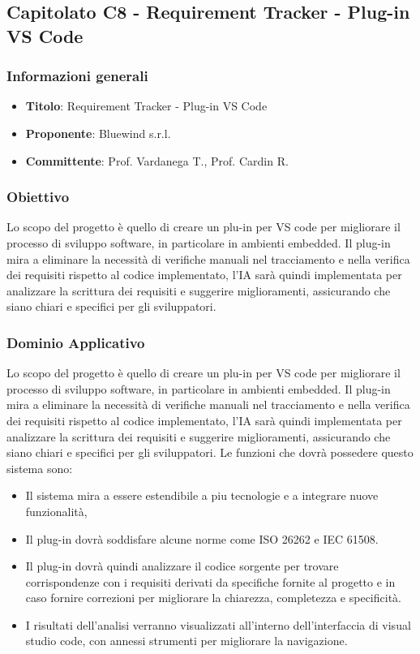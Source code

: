 \subsection{Capitolato C8 - Requirement Tracker - Plug-in VS Code}
     \subsubsection{Informazioni generali}
        \begin{itemize}
            \item \textbf{Titolo}: Requirement Tracker - Plug-in VS Code
            \item \textbf{Proponente}: Bluewind s.r.l.
            \item \textbf{Committente}: Prof. Vardanega T., Prof. Cardin R.
        \end{itemize}
    \subsubsection{Obiettivo}
    Lo scopo del progetto è quello di creare un plu-in per VS code per migliorare il processo di sviluppo software, in particolare in ambienti embedded.
Il plug-in mira a eliminare la necessità di verifiche manuali nel tracciamento e nella verifica dei requisiti rispetto al codice implementato, l’IA sarà quindi implementata per analizzare la scrittura dei requisiti e suggerire miglioramenti, assicurando che siano chiari e specifici per gli sviluppatori. 

     \subsubsection{Dominio Applicativo}
    Lo scopo del progetto è quello di creare un plu-in per VS code per migliorare il processo di sviluppo software, in particolare in ambienti embedded.
Il plug-in mira a eliminare la necessità di verifiche manuali nel tracciamento e nella verifica dei requisiti rispetto al codice implementato, l’IA sarà quindi implementata per analizzare la scrittura dei requisiti e suggerire miglioramenti, assicurando che siano chiari e specifici per gli sviluppatori. Le funzioni che dovrà possedere questo sistema sono:
\begin{itemize}
    \item Il sistema mira a essere estendibile a piu tecnologie e a integrare nuove funzionalità,
    \item  Il plug-in dovrà soddisfare alcune norme come  ISO 26262 e IEC 61508.
    \item Il plug-in dovrà quindi analizzare il codice sorgente per trovare corrispondenze con i requisiti derivati da specifiche fornite al progetto e in caso fornire correzioni per migliorare la chiarezza, completezza e specificità.
    \item  I risultati dell’analisi verranno visualizzati all’interno dell’interfaccia di visual studio code, con annessi strumenti per migliorare la navigazione.
\end{itemize}
